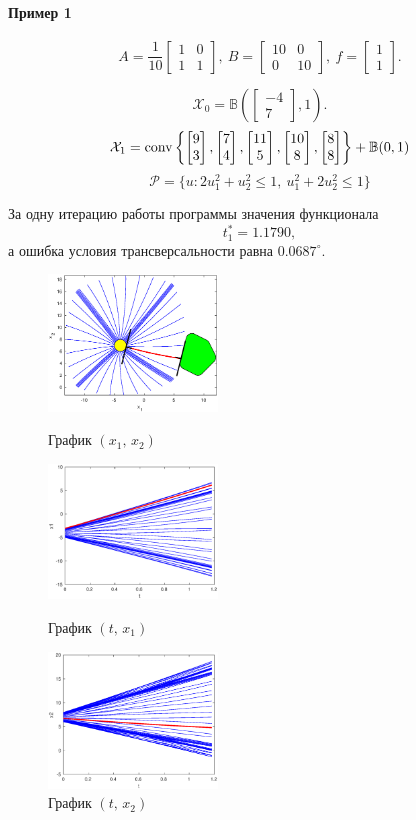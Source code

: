 \documentclass[11pt]{article}
\newcommand\PS{\mathcal{P}}
\newcommand\X{\mathcal{X}}
\newcommand\Cl[2]{\begin{bmatrix}
#1 \\ #2
\end{bmatrix}}
\newcommand\Conv[1]{{\rm conv}\left\{ #1 \right\}}
\begin{document}
\paragraph{Пример 1\\}

\begin{equation}
A = \frac1{10}\begin{bmatrix}
1 & 0 \\ 1 & 1
\end{bmatrix},\ 
B = \begin{bmatrix}
10 & 0 \\ 0 & 10
\end{bmatrix}, \
f = \begin{bmatrix}
1 \\ 1
\end{bmatrix}.
\end{equation}

$$\X_0 = \mathbb{B}\left(\Cl{-4}{7}, 1\right).$$
$$\X_1 = \Conv{\Cl{9}{3}, \Cl{7}{4}, \Cl{11}{5}, \Cl{10}{8}, \Cl{8}{8}} + \mathbb{B}(0, 1)$$
$$\PS = \{u\colon 2u_1^2 + u_2^2 \le 1, \ u_1^2 + 2u_2^2 \le 1 \}$$

За одну итерацию работы программы значения функционала 
$$t_1^* = 1.1790,$$
а ошибка условия трансверсальности равна $0.0687^\circ$.

\newpage
\begin{figure}[h]
\begin{multicols}{3}
	\hfill
	\includegraphics[width=45mm]{1xx.eps}
	\hfill
	\caption{График $(x_1, \, x_2)$}
	\hfill
	\includegraphics[width=45mm]{1tx1.eps}
	\hfill
	\caption{График $(t, \, x_1)$}
    \hfill
	\includegraphics[width=45mm]{1tx2.eps}
	\hfill
	\caption{График $(t, \, x_2)$}
\end{multicols}
\end{figure}		
\end{document}
